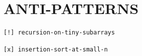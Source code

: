 \documentclass[11pt]{article}
\begin{document}
\section{ANTI-PATTERNS}\label{sec:anti-patterns}
\begin{lstlisting}[language=csl]
[!] recursion-on-tiny-subarrays
\end{lstlisting}
\begin{lstlisting}[language=csl]
[x] insertion-sort-at-small-n
\end{lstlisting}
\end{document}
